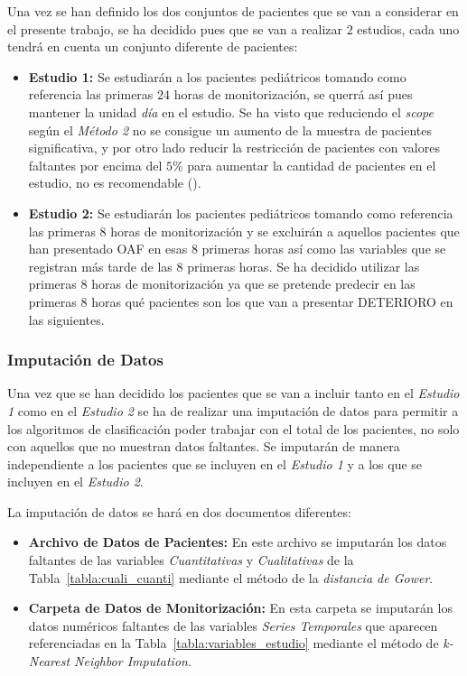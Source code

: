 Una vez se han definido los dos conjuntos de pacientes que se van a considerar en el presente trabajo, se ha decidido pues que se van a realizar $2$ estudios, cada uno tendrá en cuenta un conjunto diferente de pacientes:

\begin{itemize}
    \item \textbf{Estudio 1:} Se estudiarán a los pacientes pediátricos tomando como referencia las primeras $24$ horas de monitorización, se querrá así pues mantener la unidad \textit{día} en el estudio. Se ha visto que reduciendo el \textit{scope} según el \textit{Método 2} no se consigue un aumento de la muestra de pacientes significativa, y por otro lado reducir la restricción de pacientes con valores faltantes por encima del $5\%$ para aumentar la cantidad de pacientes en el estudio, no es recomendable (\cite{Scheffer2002}).
    \item \textbf{Estudio 2:} Se estudiarán los pacientes pediátricos tomando como referencia las primeras $8$ horas de monitorización y se excluirán a aquellos pacientes que han presentado OAF en esas 8 primeras horas así como las variables que se registran más tarde de las $8$ primeras horas. Se ha decidido utilizar las primeras $8$ horas de monitorización ya que se pretende predecir en las primeras $8$ horas qué pacientes son los que van a presentar DETERIORO en las siguientes.
\end{itemize}

\newpage
\subsubsection{Imputación de Datos}\label{sec:imputacion-de-datos}

Una vez que se han decidido los pacientes que se van a incluir tanto en el \textit{Estudio 1} como en el \textit{Estudio 2} se ha de realizar una imputación de datos para permitir a los algoritmos de clasificación poder trabajar con el total de los pacientes, no solo con aquellos que no muestran datos faltantes. Se imputarán de manera independiente a los pacientes que se incluyen en el \textit{Estudio 1} y a los que se incluyen en el \textit{Estudio 2}.

La imputación de datos se hará en dos documentos diferentes:
\begin{itemize}
    \item \textbf{Archivo de Datos de Pacientes:} En este archivo se imputarán los datos faltantes de las variables \textit{Cuantitativas} y \textit{Cualitativas} de la Tabla~\ref{tabla:cuali_cuanti} mediante el método de la \textit{distancia de Gower}.
    \item \textbf{Carpeta de Datos de Monitorización:} En esta carpeta se imputarán los datos numéricos faltantes de las variables \textit{Series Temporales} que aparecen referenciadas en la Tabla~\ref{tabla:variables_estudio} mediante el método de \textit{k-Nearest Neighbor Imputation}.
\end{itemize}

